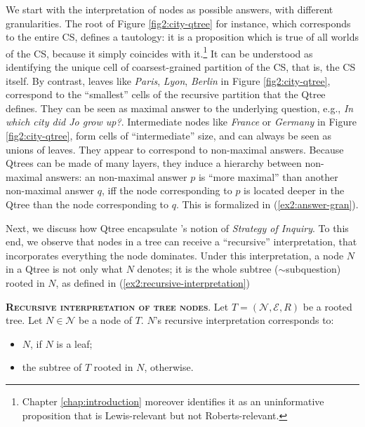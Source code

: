 We start with the interpretation of nodes as possible answers, with different granularities. The root of Figure \ref{fig2:city-qtree} for instance, which corresponds to the entire CS, defines a tautology: it is a proposition which is true of all worlds of the CS, because it simply coincides with it.\footnote{Chapter \ref{chap:introduction} moreover identifies it as an uninformative proposition that is Lewis-relevant but not Roberts-relevant.} It can be understood as identifying the unique cell of coarsest-grained partition of the CS, that is, the CS itself. By contrast, leaves like \textit{Paris}, \textit{Lyon}, \textit{Berlin} in Figure \ref{fig2:city-qtree}, correspond to the ``smallest'' cells of the recursive partition that the Qtree defines. They can be seen as maximal answer to the underlying question, e.g., \textit{In which city did Jo grow up?}. Intermediate nodes like \textit{France} or \textit{Germany} in Figure \ref{fig2:city-qtree}, form cells of ``intermediate'' size, and can always be seen as unions of leaves. They appear to correspond to non-maximal answers. Because Qtrees can be made of many layers, they induce a hierarchy between non-maximal answers: an non-maximal answer $p$ is ``more maximal'' than another non-maximal answer $q$, iff the node corresponding to $p$ is located deeper in the Qtree than the node corresponding to $q$. This is formalized in (\ref{ex2:answer-gran}).

\begin{exe}
	\label{ex2:answer-gran}
\end{exe}


Next, we discuss how Qtree encapsulate \citeauthor{Roberts1996}'s notion of \textit{Strategy of Inquiry}. To this end, we observe that nodes in a tree can receive a ``recursive'' interpretation, that incorporates everything the node dominates. Under this interpretation, a node $N$ in a Qtree is not only what $N$ denotes; it is the whole subtree ($\sim$subquestion) rooted in $N$, as defined in (\ref{ex2:recursive-interpretation})


\begin{exe}
	\ex\label{ex2:recursive-interpretation} {\textsc{\textbf{Recursive interpretation of tree nodes}}. Let $T = (\mathcal{N}, \mathcal{E}, R)$ be a rooted tree. Let $N \in \mathcal{N}$ be a node of $T$. $N$'s recursive interpretation corresponds to:
		\begin{itemize}
			\item $N$, if $N$ is a leaf;
			\item the subtree of $T$ rooted in $N$, otherwise. 
	\end{itemize}}
\end{exe}

